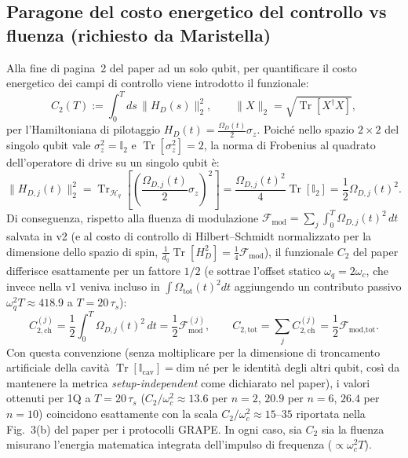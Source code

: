 \documentclass[11pt,a4paper]{article}
\begin{document}
\subsection*{Paragone del costo energetico del controllo vs fluenza (richiesto da Maristella)}
Alla fine di pagina~2 del paper ad un solo qubit, per quantificare il costo energetico dei campi di controllo viene introdotto il funzionale:
\begin{equation}
    C_2(T) := \int_0^T ds\,\|H_D(s)\|_2^2, \qquad \|X\|_2 = \sqrt{\operatorname{Tr}[X^\dagger X]},
\end{equation}
per l'Hamiltoniana di pilotaggio $H_D(t) = \frac{\Omega_D(t)}{2}\sigma_z$. Poiché nello spazio $2\times 2$ del singolo qubit vale $\sigma_z^2 = \mathbb{I}_2$ e $\operatorname{Tr}[\sigma_z^2] = 2$, la norma di Frobenius al quadrato dell'operatore di drive su un singolo qubit è:
\begin{equation}
    \|H_{D,j}(t)\|_2^2 = \operatorname{Tr}_{\mathcal{H}_q}\!\left[\left(\frac{\Omega_{D,j}(t)}{2}\sigma_z\right)^{\!2}\right] = \frac{\Omega_{D,j}(t)^2}{4}\operatorname{Tr}[\mathbb{I}_2] = \frac{1}{2}\Omega_{D,j}(t)^2.
\end{equation}
Di conseguenza, rispetto alla fluenza di modulazione $\mathcal{F}_{\text{mod}} = \sum_j \int_0^T \Omega_{D,j}(t)^2\,dt$ salvata in v2 (e al costo di controllo di Hilbert--Schmidt normalizzato per la dimensione dello spazio di spin, $\frac{1}{d_q}\operatorname{Tr}[H_D^2] = \frac{1}{4}\mathcal{F}_{\text{mod}}$), il funzionale $C_2$ del paper differisce esattamente per un fattore $1/2$ (e sottrae l'offset statico $\omega_q = 2\omega_c$, che invece nella v1 veniva incluso in $\int \Omega_{\text{tot}}(t)^2 dt$ aggiungendo un contributo passivo $\omega_q^2 T \approx 418.9$ a $T=20\,\tau_s$):
\begin{equation}
    C_{2,\text{ch}}^{(j)} = \frac{1}{2}\int_0^T \Omega_{D,j}(t)^2\,dt = \frac{1}{2}\mathcal{F}_{\text{mod}}^{(j)}, \qquad
    C_{2,\text{tot}} = \sum_{j} C_{2,\text{ch}}^{(j)} = \frac{1}{2}\mathcal{F}_{\text{mod,tot}}.
\end{equation}
Con questa convenzione (senza moltiplicare per la dimensione di troncamento artificiale della cavità $\operatorname{Tr}[\mathbb{I}_{\text{cav}}] = \text{dim}$ né per le identità degli altri qubit, così da mantenere la metrica \emph{setup-independent} come dichiarato nel paper), i valori ottenuti per 1Q a $T=20\,\tau_s$ ($C_2/\omega_c^2 \approx 13.6$ per $n=2$, $20.9$ per $n=6$, $26.4$ per $n=10$) coincidono esattamente con la scala $C_2/\omega_c^2 \approx 15\text{--}35$ riportata nella Fig.~3(b) del paper per i protocolli GRAPE. In ogni caso, sia $C_2$ sia la fluenza misurano l'energia matematica integrata dell'impulso di frequenza ($\propto \omega_c^2 T$).
\end{document}
